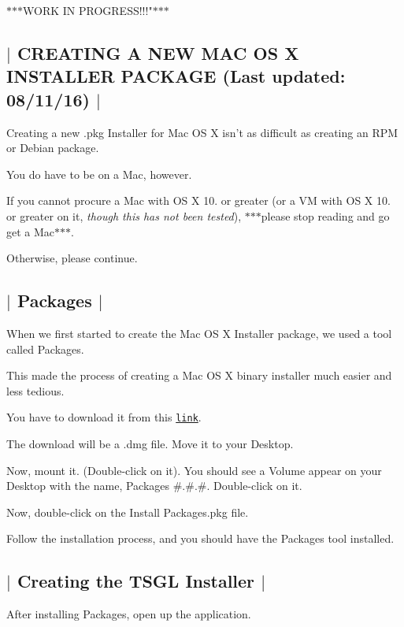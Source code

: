 $\ast$$\ast$$\ast$\-W\-O\-R\-K I\-N P\-R\-O\-G\-R\-E\-S\-S!!!"$\ast$$\ast$$\ast$ 

 \subsection*{$\vert$ C\-R\-E\-A\-T\-I\-N\-G A N\-E\-W M\-A\-C O\-S X I\-N\-S\-T\-A\-L\-L\-E\-R P\-A\-C\-K\-A\-G\-E (Last updated\-: 08/11/16) $\vert$ }

Creating a new {\ttfamily .pkg} Installer for Mac O\-S X isn't as difficult as creating an R\-P\-M or Debian package.

You do have to be on a Mac, however.

If you cannot procure a Mac with O\-S X 10. or greater (or a V\-M with O\-S X 10. or greater on it, {\itshape though this has not been tested}), $\ast$$\ast$$\ast$please stop reading and go get a Mac$\ast$$\ast$$\ast$.

Otherwise, please continue. 

 \subsection*{$\vert$ Packages $\vert$ }

When we first started to create the Mac O\-S X Installer package, we used a tool called {\ttfamily Packages}.

This made the process of creating a Mac O\-S X binary installer much easier and less tedious.

You have to download it from this \href{http://s.sudre.free.fr/Software/Packages/about.html}{\tt link}.

The download will be a {\ttfamily .dmg} file. Move it to your {\ttfamily Desktop}.

Now, mount it. (Double-\/click on it). You should see a Volume appear on your {\ttfamily Desktop} with the name, {\ttfamily Packages \#.\#.\#}. Double-\/click on it.

Now, double-\/click on the {\ttfamily Install Packages.\-pkg} file.

Follow the installation process, and you should have the {\ttfamily Packages} tool installed. 

 \subsection*{$\vert$ Creating the T\-S\-G\-L Installer $\vert$ }

After installing {\ttfamily Packages}, open up the application.

